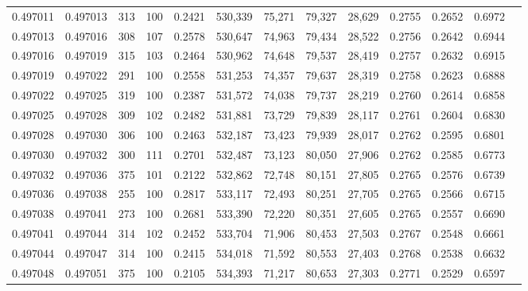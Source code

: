 \begin{tabular}{rrrrrrrrrrrrr}
0.497011 & 0.497013 &   313 & 100 &                                     0.2421 & 530,339 &  75,271 &  79,327 &  28,629 & 0.2755 & 0.2652 & 0.6972 \\
0.497013 & 0.497016 &   308 & 107 &                                     0.2578 & 530,647 &  74,963 &  79,434 &  28,522 & 0.2756 & 0.2642 & 0.6944 \\
0.497016 & 0.497019 &   315 & 103 &                                     0.2464 & 530,962 &  74,648 &  79,537 &  28,419 & 0.2757 & 0.2632 & 0.6915 \\
0.497019 & 0.497022 &   291 & 100 &                                     0.2558 & 531,253 &  74,357 &  79,637 &  28,319 & 0.2758 & 0.2623 & 0.6888 \\
0.497022 & 0.497025 &   319 & 100 &                                     0.2387 & 531,572 &  74,038 &  79,737 &  28,219 & 0.2760 & 0.2614 & 0.6858 \\
0.497025 & 0.497028 &   309 & 102 &                                     0.2482 & 531,881 &  73,729 &  79,839 &  28,117 & 0.2761 & 0.2604 & 0.6830 \\
0.497028 & 0.497030 &   306 & 100 &                                     0.2463 & 532,187 &  73,423 &  79,939 &  28,017 & 0.2762 & 0.2595 & 0.6801 \\
0.497030 & 0.497032 &   300 & 111 &                                     0.2701 & 532,487 &  73,123 &  80,050 &  27,906 & 0.2762 & 0.2585 & 0.6773 \\
0.497032 & 0.497036 &   375 & 101 &                                     0.2122 & 532,862 &  72,748 &  80,151 &  27,805 & 0.2765 & 0.2576 & 0.6739 \\
0.497036 & 0.497038 &   255 & 100 &                                     0.2817 & 533,117 &  72,493 &  80,251 &  27,705 & 0.2765 & 0.2566 & 0.6715 \\
0.497038 & 0.497041 &   273 & 100 &                                     0.2681 & 533,390 &  72,220 &  80,351 &  27,605 & 0.2765 & 0.2557 & 0.6690 \\
0.497041 & 0.497044 &   314 & 102 &                                     0.2452 & 533,704 &  71,906 &  80,453 &  27,503 & 0.2767 & 0.2548 & 0.6661 \\
0.497044 & 0.497047 &   314 & 100 &                                     0.2415 & 534,018 &  71,592 &  80,553 &  27,403 & 0.2768 & 0.2538 & 0.6632 \\
0.497048 & 0.497051 &   375 & 100 &                                     0.2105 & 534,393 &  71,217 &  80,653 &  27,303 & 0.2771 & 0.2529 & 0.6597 \\

\end{tabular}
